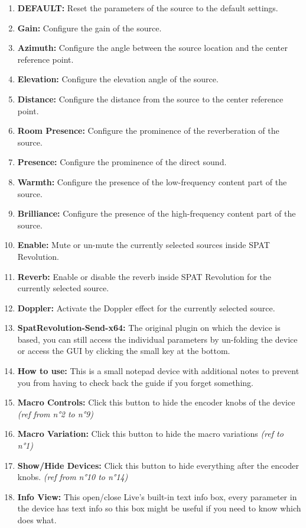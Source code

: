 \documentclass[
  letterpaper,
  DIV=11,
  numbers=noendperiod]{scrreport}
\providecommand{\tightlist}{%
  \setlength{\itemsep}{0pt}\setlength{\parskip}{0pt}}\usepackage{longtable,booktabs,array}
\begin{document}
\begin{enumerate}
\def\labelenumi{\arabic{enumi}.}
\tightlist
\item
  \textbf{DEFAULT:} Reset the parameters of the source to the default
  settings.
\item
  \textbf{Gain:} Configure the gain of the source.
\item
  \textbf{Azimuth:} Configure the angle between the source location and
  the center reference point.
\item
  \textbf{Elevation:} Configure the elevation angle of the source.
\item
  \textbf{Distance:} Configure the distance from the source to the
  center reference point.
\item
  \textbf{Room Presence:} Configure the prominence of the reverberation
  of the source.
\item
  \textbf{Presence:} Configure the prominence of the direct sound.
\item
  \textbf{Warmth:} Configure the presence of the low-frequency content
  part of the source.
\item
  \textbf{Brilliance:} Configure the presence of the high-frequency
  content part of the source.
\item
  \textbf{Enable:} Mute or un-mute the currently selected sources inside
  SPAT Revolution.
\item
  \textbf{Reverb:} Enable or disable the reverb inside SPAT Revolution
  for the currently selected source.
\item
  \textbf{Doppler:} Activate the Doppler effect for the currently
  selected source.
\item
  \textbf{SpatRevolution-Send-x64:} The original plugin on which the
  device is based, you can still access the individual parameters by
  un-folding the device or access the GUI by clicking the small key at
  the bottom.
\item
  \textbf{How to use:} This is a small notepad device with additional
  notes to prevent you from having to check back the guide if you forget
  something.
\item
  \textbf{Macro Controls:} Click this button to hide the encoder knobs
  of the device \emph{(ref from n°2 to n°9)}
\item
  \textbf{Macro Variation:} Click this button to hide the macro
  variations \emph{(ref to n°1)}
\item
  \textbf{Show/Hide Devices:} Click this button to hide everything after
  the encoder knobs. \emph{(ref from n°10 to n°14)}
\item
  \textbf{Info View:} This open/close Live's built-in text info box,
  every parameter in the device has text info so this box might be
  useful if you need to know which does what.
\end{enumerate}
\end{document}
